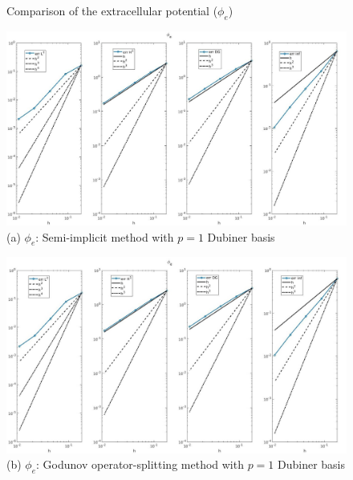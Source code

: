 \documentclass[a4paper,11pt]{article}
\begin{document}
\begin{figure}[h]
\caption{Comparison of the extracellular potential ($\phi_e$)}
\label{pe-time}
\begin{center}
\includegraphics[width = \textwidth]{./errors/D1_Phie_1.jpg}
\caption*{(a) $\phi_e$: Semi-implicit method with $p=1$ Dubiner basis}
\end{center}
\end{figure}
\begin{figure}[H]
\begin{center}
\includegraphics[width =\textwidth]{./errors/D1_Phie_1_GO.jpg}
\caption*{(b) $\phi_e$: Godunov operator-splitting method with $p=1$ Dubiner basis}
\end{center}
\end{figure}
\newpage
\end{document}
